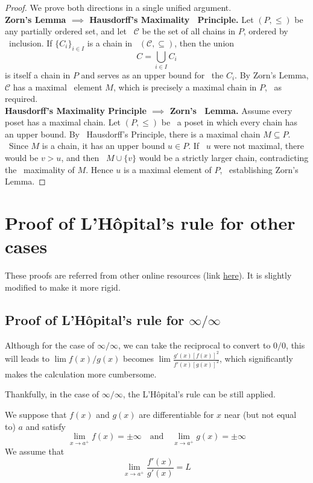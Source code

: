 \documentclass{article}
\begin{document}
\begin{proof}
    We prove both directions in a single unified argument.\\

    {\bf Zorn's Lemma $\implies$ Hausdorff's Maximality \
    Principle.}
    Let $(P,\le)$ be any partially ordered set, and let \
    $\mathcal{C}$ be the set of all chains in $P$, ordered by \
    inclusion.  If $\{C_i\}_{i\in I}$ is a chain in \
    $(\mathcal{C},\subseteq)$, then the union
    \[
        C=\bigcup_{i\in I}C_i
    \]
    is itself a chain in $P$ and serves as an upper bound for \
    the $C_i$.  By Zorn's Lemma, $\mathcal{C}$ has a maximal \
    element $M$, which is precisely a maximal chain in $P$, \
    as required.\\

    {\bf Hausdorff's Maximality Principle $\implies$ Zorn's \
    Lemma.}
    Assume every poset has a maximal chain.  Let $(P,\le)$ be \
    a poset in which every chain has an upper bound.  By \
    Hausdorff's Principle, there is a maximal chain $M\subseteq P$.  \
    Since $M$ is a chain, it has an upper bound $u\in P$.  If \
    $u$ were not maximal, there would be $v>u$, and then \
    $M\cup\{v\}$ would be a strictly larger chain, contradicting the \
    maximality of $M$.  Hence $u$ is a maximal element of $P$, \
    establishing Zorn's Lemma.
\end{proof}

\section{Proof of L'H\^opital's rule for other cases}
These proofs are referred from other online resources 
(link \href{https://www.macmillanlearning.com/studentresources/highschool/mathematics/rogawskiap2e/additionalproofs/proofoflhopitalsrule.pdf}{here}).
It is slightly modified to make it more rigid.
\subsection{Proof of L'H\^opital's rule for $\infty/\infty$}
Although for the case of $\infty/\infty$, we can take the reciprocal to convert to $0/0$,
this will leads to $\lim f(x)/g(x)$ becomes $\lim \frac{g'(x)[f(x)]^2}{f'(x)[g(x)]^2}$,
which significantly makes the calculation more cumbersome.

Thankfully, in the case of $\infty/\infty$, the L'H\^opital's rule can be still applied.

We suppose that \( f(x) \) and \( g(x) \) are differentiable for
\( x \) near (but not equal to) \( a \) and satisfy
\[
    \lim_{x \to a^+} f(x) = \pm \infty \quad \text{and} \quad \lim_{x \to a^+} g(x) = \pm \infty
\]
We assume that
\[
    \lim_{x \to a^+} \frac{f'(x)}{g'(x)} = L
\]
\end{document}
